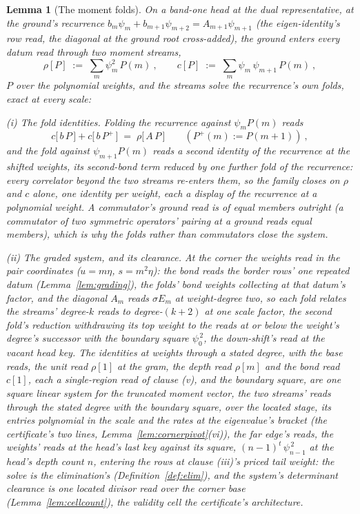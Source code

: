 \documentclass[11pt]{article}
\newtheorem{lemma}{Lemma}
\theoremstyle{definition}
\begin{document}
\begin{lemma}[The moment folds]\label{lem:momentfold}
On a band-one head at the dual representative, at the ground's
recurrence $b_{m}\psi_{m}+b_{m+1}\psi_{m+2}=A_{m+1}\psi_{m+1}$ (the
eigen-identity's row read, the diagonal at the ground root
cross-added), the ground enters every datum read through two
moment streams,
\[
\rho[P]\;:=\;\sum_m \psi_m^{2}\,P(m)\ ,
\qquad
c[P]\;:=\;\sum_m \psi_m\,\psi_{m+1}\,P(m)\ ,
\]
$P$ over the polynomial weights, and the streams solve the
recurrence's own folds, exact at every scale:

\emph{(i) The fold identities.} Folding the recurrence against
$\psi_m P(m)$ reads
\[
c\big[\,b\,P\,\big]+c\big[\,b\,P^{+}\,\big]
\;=\;\rho\big[\,A\,P\,\big]
\qquad(P^{+}(m):=P(m{+}1))\ ,
\]
and the fold against $\psi_{m+1}P(m)$ reads a second identity of
the recurrence at the
shifted weights, its second-bond term reduced by one further fold
of the recurrence: every correlator beyond the two streams
re-enters them, so the family closes on $\rho$ and $c$ alone, one
identity per weight, each a display of the recurrence at a
polynomial weight. A commutator's ground read is of equal members
outright
(a commutator of two symmetric operators' pairing at a
ground reads equal members), which is why the folds rather than
commutators close the system.

\emph{(ii) The graded system, and its clearance.} At the corner
the weights read in the pair coordinates ($u=m\eta$,
$s=m^{2}\eta$): the bond reads the border rows' one repeated
datum (Lemma~\ref{lem:grading}), the folds' bond weights
collecting at that datum's factor, and the diagonal $A_m$ reads
$\sigma E_m$ at weight-degree two, so each fold relates the
streams' degree-$k$ reads to degree-$(k{+}2)$ at one scale
factor, the second fold's reduction withdrawing its top weight to
the reads at or below the weight's degree's successor with the
boundary square $\psi_0^{\,2}$, the down-shift's read at the
vacant head key. The identities at weights through a stated
degree, with the base reads, the unit read $\rho[1]$ at the gram,
the depth read $\rho[m]$ and the bond read $c[1]$, each a
single-region read of clause (v), and the boundary square, are
one square linear system for the truncated moment vector, the two
streams' reads through the stated degree with the boundary
square, over the located stage, its entries polynomial in the
scale and the rates at the eigenvalue's bracket (the
certificate's two lines, Lemma~\ref{lem:cornerpivot}(vi)), the
far edge's reads, the weights' reads at the head's last key
against its square, $(n{-}1)^{t}\,\psi_{n-1}^{\,2}$ at the head's
depth count $n$, entering the rows at clause (iii)'s priced tail
weight: the solve is the elimination's
(Definition~\ref{def:elim}), and the system's determinant
clearance is one located divisor read over the corner base
(Lemma~\ref{lem:cellcount}), the validity cell the certificate's
architecture.


\end{lemma}
\end{document}
